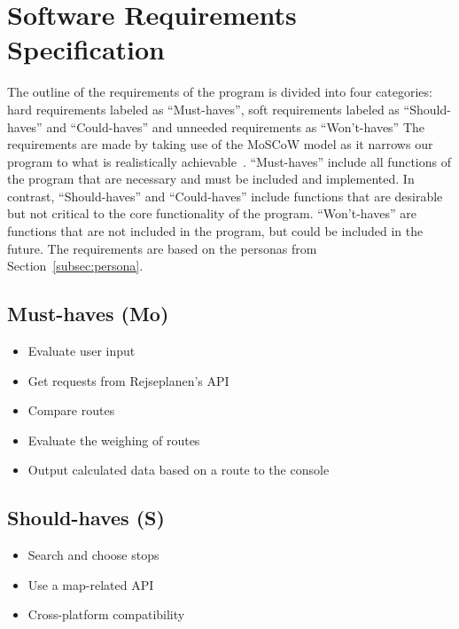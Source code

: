 \section{Software Requirements Specification}\label{sec:software-requirements-specification}

The outline of the requirements of the program is divided into four categories: hard requirements labeled as
``Must-haves'', soft requirements labeled as ``Should-haves'' and ``Could-haves'' and
unneeded requirements as ``Won't-haves''
The requirements are made by taking use of the MoSCoW model as it narrows our program to what is realistically
achievable~\cite{hudaib2018requirements}.
``Must-haves'' include all functions of the program that are necessary and must be included and implemented.
In contrast, ``Should-haves'' and ``Could-haves'' include functions that are desirable but not critical to
the core functionality of the program.
``Won't-haves'' are functions that are not included in the program, but could be included in the future.
The requirements are based on the personas from Section~\ref{subsec:persona}.

\subsection{Must-haves (Mo)}\label{subsec:must-haves}

\begin{itemize}
    \item Evaluate user input
    \item Get requests from Rejseplanen’s API
    \item Compare routes
    \item Evaluate the weighing of routes
    \item Output calculated data based on a route to the console
\end{itemize}

\subsection{Should-haves (S)}\label{subsec:should-haves}

\begin{itemize}
    \item Search and choose stops
    \item Use a map-related API
    \item Cross-platform compatibility
\end{itemize}

